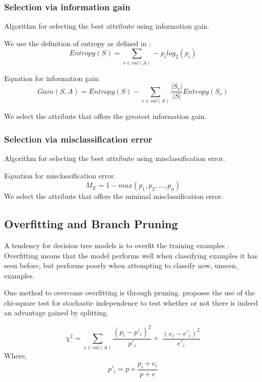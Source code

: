 \documentclass{IEEEtran}
\begin{document}
\subsubsection{Selection via information gain}
Algorithm for selecting the best attribute using information gain.

We use the definition of entropy as defined in \parencite{mitchell1997machine}:
\begin{equation}
\label{entropy-equation}
Entropy(S) = \sum_{v\in val(A)}-p_ilog_2(p_i)
\end{equation}

Equation for information gain:
\begin{equation}
\label{information-gain-equation}
Gain(S,A) = Entropy(S) -\sum_{v \in val(A)}\frac{|S_v|}{|S|}Entropy(S_v)
\end{equation}


We select the attribute that offers the greatest information gain.

\subsubsection{Selection via misclassification error}
Algorithm for selecting the best attribute using misclassification
error.

Equation for misclassification error.
\begin{equation}
\label{misclassification-error-equation}
M_E = 1 - max(p_1, p_2, ..., p_n) 
\end{equation}
We select the attribute that offers the minimal misclassification
error.


\subsection{Overfitting and Branch Pruning}
A tendency for decision tree models is to overfit the training
examples \parencite{mitchell1997machine}. Overfitting means that the
model performs well when classifying examples it has seen before, but
performs poorly when attempting to classify new, unseen, examples.

One method to overcome overfitting is through
pruning. \parencite{quinlan1986induction} proposes the use of the
chi-square test for stochastic independence to test whether or not
there is indeed an advantage gained by splitting.

\begin{equation}
\label{chi-square-equation}
\chi^2 = \sum_{v\in val(A)}\frac{(p_i-p'_i)^2}{p'_i} + \
\frac{(e_i-e'_i)^2}{e'_i}
\end{equation}
Where,
\begin{equation}
\label{chi-square-helper-equation}
p'_i = p \times \frac{p_i+e_i}{p+e}
\end{equation}
\end{document}
